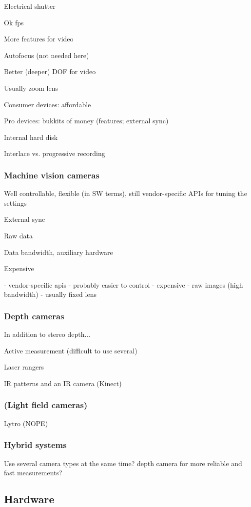 Electrical shutter

Ok fps

More features for video

Autofocus (not needed here)

Better (deeper) DOF for video

Usually zoom lens

Consumer devices: affordable

Pro devices: bukkits of money (features; external sync)

Internal hard disk

Interlace vs. progressive recording

\subsubsection{Machine vision cameras}

Well controllable, flexible (in SW terms), still vendor-specific APIs for tuning the settings

External sync

Raw data

Data bandwidth, auxiliary hardware

Expensive

- vendor-specific apis
- probably easier to control
- expensive
- raw images (high bandwidth)
- usually fixed lens
\subsubsection{Depth cameras}

In addition to stereo depth...

Active measurement (difficult to use several)

Laser rangers

IR patterns and an IR camera (Kinect)

\subsubsection{(Light field cameras)}

Lytro (NOPE)

\subsubsection{Hybrid systems}

Use several camera types at the same time? depth camera for more reliable and fast measurements?


\subsection{Hardware}

